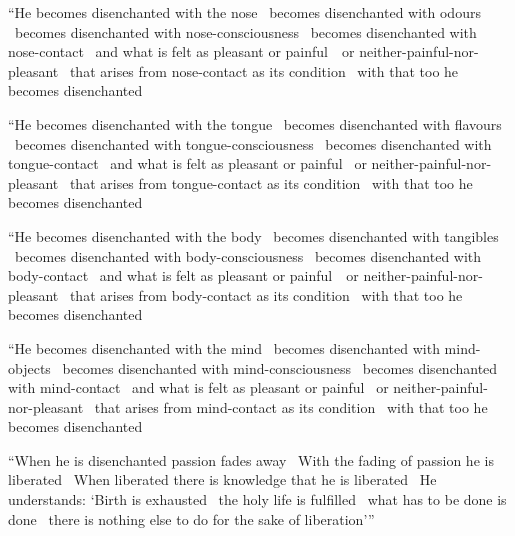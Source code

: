 \begin{english-only-hang}
  ``He becomes disenchanted with the nose \breathmark\ becomes disenchanted with odours \breathmark\ becomes disenchanted with nose-consciousness \breathmark\ becomes disenchanted with nose-contact \breathmark\ and what is felt as pleasant or \mbox{painful}~\breathmark\ or neither-painful-nor-pleasant \breathmark\ that arises from nose-contact as its condition \breathmark\ with that too he becomes disenchanted
\end{english-only-hang}

\begin{english-only-hang}
  ``He becomes disenchanted with the tongue \breathmark\ becomes disenchanted with flavours \breathmark\ becomes disenchanted with tongue-consciousness \breathmark\ becomes disenchanted with tongue-contact \breathmark\ and what is felt as pleasant or painful \breathmark\ or neither-painful-nor-pleasant \breathmark\ that arises from tongue-contact as its condition \breathmark\ with that too he becomes disenchanted
\end{english-only-hang}

\begin{english-only-hang}
  ``He becomes disenchanted with the body \breathmark\ becomes disenchanted with tangibles \breathmark\ becomes disenchanted with body-consciousness \breathmark\ becomes disenchanted with body-contact \breathmark\ and what is felt as pleasant or \mbox{painful}~\breathmark\ or neither-painful-nor-pleasant \breathmark\ that arises from body-contact as its condition \breathmark\ with that too he becomes disenchanted
\end{english-only-hang}

\begin{english-only-hang}
  ``He becomes disenchanted with the mind \breathmark\ becomes disenchanted with mind-objects \breathmark\ becomes disenchanted with mind-consciousness \breathmark\ becomes disenchanted with mind-contact \breathmark\ and what is felt as pleasant or painful \breathmark\ or neither-painful-nor-pleasant \breathmark\ that arises from mind-contact as its condition \breathmark\ with that too he becomes disenchanted
\end{english-only-hang}

\begin{english-only-hang}
  ``When he is disenchanted passion fades away \breathmark\ With the fading of passion he is liberated \breathmark\ When liberated there is knowledge that he is liberated \breathmark\ He understands: `Birth is exhausted \breathmark\ the holy life is fulfilled \breathmark\ what has to be done is done \breathmark\ there is nothing else to do for the sake of liberation'''
\end{english-only-hang}

